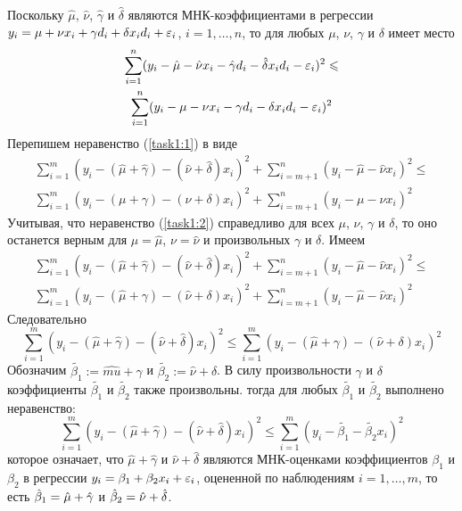 \begin{problem}
\begin{sol}
Поскольку $\hat{\mu}$, $\hat{\nu}$, $\hat{\gamma}$ и $\hat{\delta}$ являются МНК-коэффициентами в регрессии $y_i = \mu + \nu x_i + \gamma d_i + \delta x_i d_i + \varepsilon_i$, $i = 1, \ldots, n$, то для любых $\mu$, $\nu$, $\gamma$ и $\delta$ имеет место
\begin{multline}
\label{task1:1}\sum_{i=1}^n (y_i - \hat{\mu} - \hat{\nu} x_i - \hat{\gamma} d_i - \hat{\delta} x_i d_i - \varepsilon_i)^2 \leqslant \\
\sum_{i=1}^n (y_i - \mu - \nu x_i - \gamma d_i - \delta x_i d_i - \varepsilon_i)^2
\end{multline}
Перепишем неравенство (\ref{task1:1}) в виде
\begin{multline}
\label{task1:2}\sum_{i=1}^m (y_i - (\hat{\mu} + \hat{\gamma}) - (\hat{\nu} + \hat{\delta}) x_i)^2 + \sum_{i= m + 1}^n (y_i - \hat{\mu} - \hat{\nu} x_i)^2 \leqslant \\
\sum_{i=1}^m (y_i - ({\mu} + {\gamma}) - ({\nu} + {\delta}) x_i)^2 + \sum_{i= m + 1}^n (y_i - {\mu} - {\nu} x_i)^2
\end{multline}
Учитывая, что неравенство (\ref{task1:2}) справедливо для всех $\mu$, $\nu$, $\gamma$ и $\delta$, то оно останется верным для $\mu = \hat{\mu}$, $\nu = \hat{\nu}$ и произвольных $\gamma$ и $\delta$. Имеем
\begin{multline*}
\sum_{i=1}^m (y_i - (\hat{\mu} + \hat{\gamma}) - (\hat{\nu} + \hat{\delta}) x_i)^2 + \sum_{i= m + 1}^n (y_i - \hat{\mu} - \hat{\nu} x_i)^2 \leqslant \\
 \sum_{i=1}^m (y_i - (\hat{\mu} + {\gamma}) - (\hat{\nu} + {\delta}) x_i)^2 + \sum_{i= m + 1}^n (y_i - \hat{\mu} - \hat{\nu} x_i)^2
\end{multline*}
Следовательно
\begin{equation*}
\sum_{i=1}^m (y_i - (\hat{\mu} + \hat{\gamma}) - (\hat{\nu} + \hat{\delta}) x_i)^2 \leqslant \sum_{i=1}^m (y_i - (\hat{\mu} + {\gamma}) - (\hat{\nu} + {\delta}) x_i)^2
\end{equation*}
Обозначим $\tilde{\beta_1} := \hat{mu} + \gamma$ и $\tilde{\beta_2} := \hat{\nu} + \delta$. В силу произвольности $\gamma$ и $\delta$ коэффициенты $\tilde{\beta_1}$ и $\tilde{\beta_2}$ также произвольны. тогда для любых $\tilde{\beta_1}$ и $\tilde{\beta_2}$ выполнено неравенство:
\[
\sum_{i=1}^m (y_i - (\hat{\mu} + \hat{\gamma}) - (\hat{\nu} + \hat{\delta}) x_i)^2 \leqslant \sum_{i=1}^m (y_i - \tilde{\beta_1} - \tilde{\beta_2} x_i)^2
\]
которое означает, что $\hat{\mu} + \hat{\gamma}$ и $\hat{\nu} + \hat{\delta}$ являются МНК-оценками коэффициентов $\beta_1$ и $\beta_2$ в регрессии $y_i = \beta_1 + \beta_2 x_i + \varepsilon_i$, оцененной по наблюдениям $i = 1, \ldots, m$, то есть $\hat{\beta}_1 = \hat{\mu} + \hat{\gamma}$ и $\hat{\beta}_2 = \hat{\nu} + \hat{\delta}$.
\end{sol}
\end{problem}


